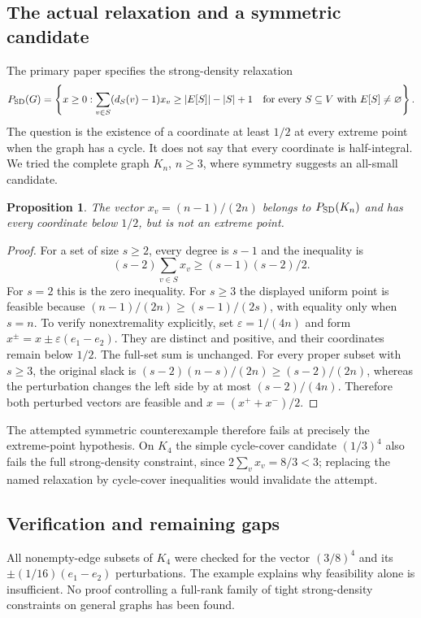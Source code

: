 \documentclass[11pt]{article}
\newtheorem{proposition}{Proposition}
\begin{document}
\subsection{The actual relaxation and a symmetric candidate}
The primary paper specifies the strong-density relaxation
\[
 P_{\rm SD}(G)=\left\{x\ge0:
 \sum_{v\in S}(d_S(v)-1)x_v\ge |E[S]|-|S|+1
 \quad\text{for every }S\subseteq V\text{ with }E[S]\ne\varnothing\right\}.
\]
The question is the existence of a coordinate at least $1/2$ at every extreme point when the graph has a cycle. It does not say that every coordinate is half-integral. We tried the complete graph $K_n$, $n\ge3$, where symmetry suggests an all-small candidate.
\begin{proposition}
The vector $x_v=(n-1)/(2n)$ belongs to $P_{\rm SD}(K_n)$ and has every coordinate below $1/2$, but is not an extreme point.
\end{proposition}
\begin{proof}
For a set of size $s\ge2$, every degree is $s-1$ and the inequality is
\[
 (s-2)\sum_{v\in S}x_v\ge (s-1)(s-2)/2.
\]
For $s=2$ this is the zero inequality. For $s\ge3$ the displayed uniform point is feasible because $(n-1)/(2n)\ge(s-1)/(2s)$, with equality only when $s=n$.
To verify nonextremality explicitly, set $\varepsilon=1/(4n)$ and form $x^\pm=x\pm\varepsilon(e_1-e_2)$. They are distinct and positive, and their coordinates remain below $1/2$. The full-set sum is unchanged. For every proper subset with $s\ge3$, the original slack is $(s-2)(n-s)/(2n)\ge(s-2)/(2n)$, whereas the perturbation changes the left side by at most $(s-2)/(4n)$. Therefore both perturbed vectors are feasible and $x=(x^++x^-)/2$.
\end{proof}
The attempted symmetric counterexample therefore fails at precisely the extreme-point hypothesis. On $K_4$ the simple cycle-cover candidate $(1/3)^4$ also fails the full strong-density constraint, since $2\sum_vx_v=8/3<3$; replacing the named relaxation by cycle-cover inequalities would invalidate the attempt.
\subsection{Verification and remaining gaps}
All nonempty-edge subsets of $K_4$ were checked for the vector $(3/8)^4$ and its $\pm(1/16)(e_1-e_2)$ perturbations. The example explains why feasibility alone is insufficient. No proof controlling a full-rank family of tight strong-density constraints on general graphs has been found.
\end{document}
